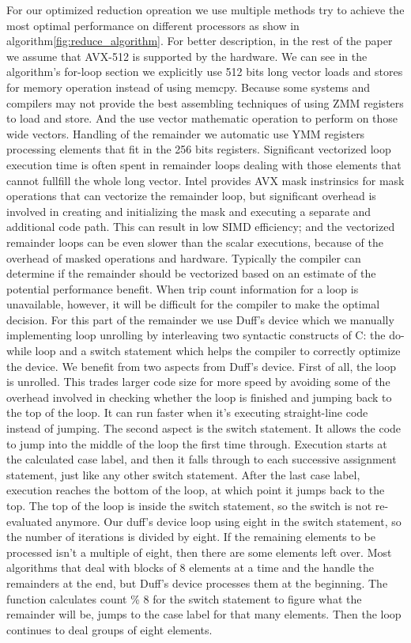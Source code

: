 \documentclass[sigconf]{acmart}
\begin{document}
%
For our optimized reduction opreation we use multiple methods try to achieve the
most optimal performance on different processors as show in algorithm\ref{fig:reduce_algorithm}.
For better description, in the rest of the paper we assume that AVX-512 is supported by the hardware.
We can see in the algorithm's for-loop section we explicitly use 512 bits long vector loads and stores
for memory operation instead of using memcpy.  Because some systems and compilers
may not provide the best assembling techniques of using ZMM registers to load
and store. And the use vector mathematic operation to perform on those wide vectors.
Handling of the remainder we automatic use YMM registers processing elements that fit in the 256 bits registers.
Significant vectorized loop execution time is often spent in remainder
loops dealing with those elements that cannot fullfill the whole long vector.
Intel provides AVX mask instrinsics for mask operations that can vectorize the remainder loop,
but significant overhead is involved in creating and initializing the mask and executing a separate and additional code path.
This can result in low SIMD efficiency; and the vectorized remainder loops can be
even slower than the scalar executions, because of the overhead of
masked operations and hardware. Typically
the compiler can determine if the remainder should be vectorized
based on an estimate of the potential performance benefit. When trip count information for a
loop is unavailable, however, it will be difficult for the
compiler to make the optimal decision.
For this part of the remainder we use Duff's device which we manually implementing loop unrolling by interleaving two syntactic constructs of C: the do-while loop and a switch statement which helps the compiler to correctly optimize the device.
We benefit from two aspects from Duff's device. First of all, the loop is unrolled.
This trades larger code size for more speed by avoiding some of the overhead
involved in checking whether the loop is finished and jumping back to the
top of the loop. It can run faster when it's executing straight-line code instead of jumping.
The second aspect is the switch statement. It allows the code to jump into the middle of the
loop the first time through.
Execution starts at the calculated case label, and then it falls through to each successive
assignment statement, just like any other switch statement. After the last case label, execution reaches the bottom of the loop, at which point it jumps back to the top. The top of the loop is inside the switch statement, so the switch is not re-evaluated anymore.
Our duff's device loop using eight in the switch statement, so the number of iterations is divided by eight.
If the remaining elements to be processed isn't a multiple of eight, then there are some elements left over.
Most algorithms that deal with blocks of 8 elements at a time and the handle the remainders at the end,
but Duff's device processes them at the beginning. The function calculates count \% 8 for the switch statement to figure what the remainder will be, jumps to the case label for that many elements. Then the loop continues to deal groups of eight elements.
\end{document}
